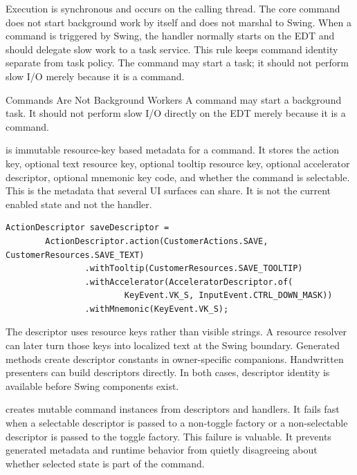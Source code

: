 Execution is synchronous and occurs on the calling thread. The core command
does not start background work by itself and does not marshal to Swing. When a
command is triggered by Swing, the handler normally starts on the EDT and
should delegate slow work to a task service. This rule keeps command identity
separate from task policy. The command may start a task; it should not perform
slow I/O merely because it is a command.

\begin{pitfallbox}{Commands Are Not Background Workers}
A command may start a background task. It should not perform slow I/O directly
on the EDT merely because it is a command.
\end{pitfallbox}

 is immutable resource-key based metadata for a command.
It stores the action key, optional text resource key, optional tooltip resource
key, optional accelerator descriptor, optional mnemonic key code, and whether
the command is selectable. This is the metadata that several UI surfaces can
share. It is not the current enabled state and not the handler.

\begin{lstlisting}[caption={Command metadata without visible strings.}]
ActionDescriptor saveDescriptor =
        ActionDescriptor.action(CustomerActions.SAVE, CustomerResources.SAVE_TEXT)
                .withTooltip(CustomerResources.SAVE_TOOLTIP)
                .withAccelerator(AcceleratorDescriptor.of(
                        KeyEvent.VK_S, InputEvent.CTRL_DOWN_MASK))
                .withMnemonic(KeyEvent.VK_S);
\end{lstlisting}

The descriptor uses resource keys rather than visible strings. A resource
resolver can later turn those keys into localized text at the Swing boundary.
Generated  methods create descriptor constants in
owner-specific companions. Handwritten presenters can build descriptors
directly. In both cases, descriptor identity is available before Swing
components exist.

 creates mutable command instances from descriptors and
handlers. It fails fast when a selectable descriptor is passed to a non-toggle
factory or a non-selectable descriptor is passed to the toggle factory. This
failure is valuable. It prevents generated metadata and runtime behavior from
quietly disagreeing about whether selected state is part of the command.

